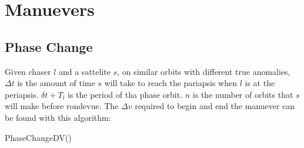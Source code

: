 \section{Manuevers}
\subsection{Phase Change}
Given chaser $l$ and a sattelite $s$, on similar orbits with different true anomalies, $\Delta{}t$ is the amount of time $s$
will take to reach the pariapsis when $l$ is at the periapsis. $\delta{}t + T_{l}$ is the period of tha phase orbit.
$n$ is the number of orbits that $s$ will make before rondevue. The $\Delta{}v$ required to begin and end the manuever
can be found with this algorithm:
\begin{function}
    \DontPrintSemicolon
    \caption{PhaseChangeDV()}
\end{function}
